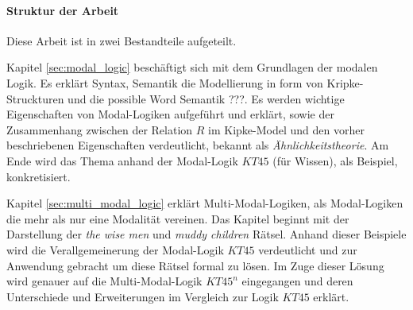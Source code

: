 
\paragraph{Struktur der Arbeit} %
\label{par:struktur_der_arbeit}

Diese Arbeit ist in zwei Bestandteile aufgeteilt. 

Kapitel \ref{sec:modal_logic} beschäftigt sich mit dem Grundlagen der modalen Logik. Es erklärt Syntax, Semantik die Modellierung in form von Kripke-Struckturen und die possible Word Semantik ???. 
Es werden wichtige Eigenschaften von Modal-Logiken aufgeführt und erklärt, sowie der Zusammenhang zwischen der Relation $R$ im Kipke-Model und den vorher beschriebenen Eigenschaften verdeutlicht, bekannt als \emph{Ähnlichkeitstheorie}.
Am Ende wird das Thema anhand der Modal-Logik $KT45$ (für Wissen), als Beispiel, konkretisiert.

Kapitel \ref{sec:multi_modal_logic} erklärt Multi-Modal-Logiken, als Modal-Logiken die mehr als nur eine Modalität vereinen. Das Kapitel beginnt mit der Darstellung der \emph{the wise men} und \emph{muddy children} Rätsel. 
Anhand dieser Beispiele wird die Verallgemeinerung der Modal-Logik $KT45$ verdeutlicht und zur Anwendung gebracht um diese Rätsel formal zu lösen.
Im Zuge dieser Lösung wird genauer auf die Multi-Modal-Logik $KT45^n$ eingegangen und deren Unterschiede und Erweiterungen im Vergleich zur Logik $KT45$ erklärt.





